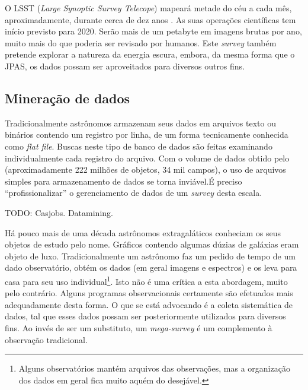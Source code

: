 O LSST ({\em Large Synoptic Survey Telecope}) mapeará metade do céu a cada mês,
aproximadamente, durante cerca de dez anos \citep{Ivezic2008}. As suas operações
científicas tem início previsto para 2020. Serão mais de um petabyte em imagens
brutas por ano, muito mais do que poderia ser revisado por humanos. Este {\em
survey} também pretende explorar a natureza da energia escura, embora, da mesma
forma que o JPAS, os dados possam ser aproveitados para diversos outros fins.

\subsection{Mineração de dados}

Tradicionalmente astrônomos armazenam seus dados em arquivos texto ou binários
contendo um registro por linha, de um forma tecnicamente conhecida como {\em
flat file}. Buscas neste tipo de banco de dados são feitas examinando
individualmente cada registro do arquivo. Com o volume de dados obtido pelo
\galex (aproximadamente 222 milhões de objetos, 34 mil campos), o uso de
arquivos simples para armazenamento de dados se torna inviável.\citneed É
preciso ``profissionalizar'' o gerenciamento de dados de um {\em survey} desta
escala.

TODO: Casjobs. Datamining.

Há pouco mais de uma década astrônomos extragaláticos conheciam os seus objetos
de estudo pelo nome. Gráficos contendo algumas dúzias de galáxias eram objeto de
luxo. Tradicionalmente um astrônomo faz um pedido de tempo de um dado
observatório, obtém os dados (em geral imagens e espectros) e os leva para casa
para seu uso individual\footnote{Alguns observatórios mantém arquivos das
observações\citneed, mas a organização dos dados em geral fica muito aquém do
desejável.}. Isto não é uma crítica a esta abordagem, muito pelo contrário.
Alguns programas observacionais certamente são efetuados mais adequadamente
desta forma. O que se está advocando é a coleta sistemática de dados, tal que
esses dados possam ser posteriormente utilizados para diversos fins. Ao invés de
ser um substituto, um {\em mega-survey} é um complemento à observação
tradicional.\fixme





